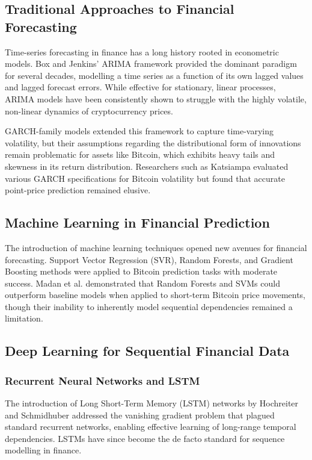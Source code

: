 \documentclass[12pt]{article}
\begin{document}
\subsection{Traditional Approaches to Financial Forecasting}

Time-series forecasting in finance has a long history rooted in econometric models. Box and Jenkins' ARIMA framework \cite{box2015} provided the dominant paradigm for several decades, modelling a time series as a function of its own lagged values and lagged forecast errors. While effective for stationary, linear processes, ARIMA models have been consistently shown to struggle with the highly volatile, non-linear dynamics of cryptocurrency prices.

GARCH-family models extended this framework to capture time-varying volatility, but their assumptions regarding the distributional form of innovations remain problematic for assets like Bitcoin, which exhibits heavy tails and skewness in its return distribution. Researchers such as Katsiampa \cite{katsiampa2017} evaluated various GARCH specifications for Bitcoin volatility but found that accurate point-price prediction remained elusive.

\subsection{Machine Learning in Financial Prediction}

The introduction of machine learning techniques opened new avenues for financial forecasting. Support Vector Regression (SVR), Random Forests, and Gradient Boosting methods were applied to Bitcoin prediction tasks with moderate success. Madan et al. \cite{madan2015} demonstrated that Random Forests and SVMs could outperform baseline models when applied to short-term Bitcoin price movements, though their inability to inherently model sequential dependencies remained a limitation.

\subsection{Deep Learning for Sequential Financial Data}

\subsubsection{Recurrent Neural Networks and LSTM}

The introduction of Long Short-Term Memory (LSTM) networks by Hochreiter and Schmidhuber \cite{hochreiter1997} addressed the vanishing gradient problem that plagued standard recurrent networks, enabling effective learning of long-range temporal dependencies. LSTMs have since become the de facto standard for sequence modelling in finance.
\end{document}
